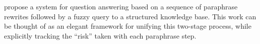  propose a system for question answering
  based on a sequence of paraphrase rewrites followed by a fuzzy query to
  a structured knowledge base.
This work can be thought of as an elegant framework for unifying this
  two-stage process, while explicitly tracking the ``risk'' taken with
  each paraphrase step.

  
